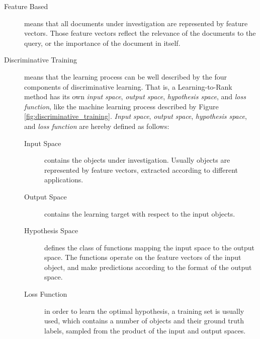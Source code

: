 \begin{description}
\item[Feature Based]{means that all documents under investigation are represented by feature vectors. Those feature vectors reflect the relevance of the documents to the query, or the importance of the document in itself.}
\item[Discriminative Training]{means that the learning process can be well described by the four components of discriminative learning. That is, a Learning-to-Rank method has its own \emph{input space}, \emph{output space}, \emph{hypothesis space}, and \emph{loss function}, like the machine learning process described by Figure \ref{fig:discriminative_training}. \emph{Input space}, \emph{output space}, \emph{hypothesis space}, and \emph{loss function} are hereby defined as follows:
	\begin{description}
	\item[Input Space]{contains the objects under investigation. Usually objects are represented by feature vectors, extracted according to different applications.}
	\item[Output Space]{contains the learning target with respect to the input objects.}
	\item[Hypothesis Space]{defines the class of functions mapping the input space to the output space. The functions operate on the feature vectors of the input object, and make predictions according to the format of the output space.}
	\item[Loss Function]{in order to learn the optimal hypothesis, a training set is usually used, which contains a number of objects and their ground truth labels, sampled from the product of the input and output spaces.}
	\end{description}
	}
\end{description}



